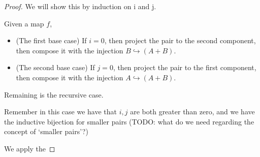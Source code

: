\documentclass{proc-l}
\theoremstyle{definition}
\theoremstyle{remark}
\numberwithin{equation}{section}
\begin{document}
\begin{proof}
We will show this by induction on i and j.

Given a map \(f\),

\begin{itemize}
\item (The first base case) If \(i = 0\), then project the pair to the second component, then compose it with the injection \(B \hookrightarrow (A + B)\).

\item (The second base case) If \(j = 0\), then project the pair to the first component, then compose it with the injection \(A \hookrightarrow (A + B)\).
\end{itemize}

Remaining is the recursive case.

Remember in this case we have that \(i, j\) are both greater than zero, and we have the inductive bijection for smaller pairs (TODO: what do we need regarding the concept of `smaller pairs'?)

We apply the 





\end{proof}


\end{document}
